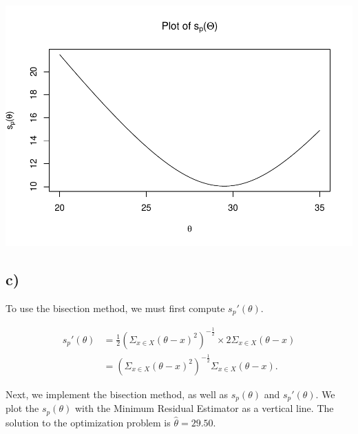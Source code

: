 \documentclass[]{article}
\begin{document}
\includegraphics{Atlas-PS_2_files/figure-latex/unnamed-chunk-1-1.pdf}

\subsection{c)}\label{c}

To use the bisection method, we must first compute
\(s_p\prime(\theta)\).

\begin{align*}
  s_p\prime (\theta) &= \frac{1}{2} (\Sigma_{x \in X} (\theta - x)^{2})^{-\frac{1}{2}} \times 2 \Sigma_{x\in X}(\theta-x) \\
  &= (\Sigma_{x \in X} (\theta - x)^{2})^{-\frac{1}{2}} \Sigma_{x\in X}(\theta - x).
\end{align*}

Next, we implement the bisection method, as well as \(s_p(\theta)\) and
\(s_p \prime (\theta)\). We plot the \(s_p(\theta)\) with the Minimum
Residual Estimator as a vertical line. The solution to the optimization
problem is \(\hat{\theta}=29.50\).
\end{document}
